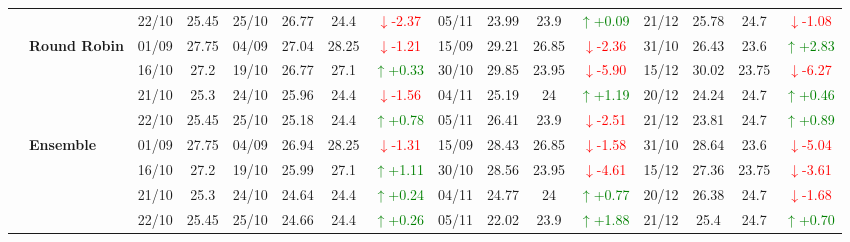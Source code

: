 \documentclass{ieeeaccess}
\begin{document}
{\begin{longtable}{llcc|cccc|cccc|cccc}
&
& 22/10 & 25.45 & 25/10 & 26.77 & 24.4 & \textcolor{red}{\(\downarrow\)-2.37} & 05/11 & 23.99 & 23.9 & \textcolor{green}{\(\uparrow\)+0.09} & 21/12 & 25.78 & 24.7 & \textcolor{red}{\(\downarrow\)-1.08} \\
\cmidrule(lr){2-16}


& \textbf{Round Robin}
& 01/09 & 27.75 & 04/09 & 27.04 & 28.25 & \textcolor{red}{\(\downarrow\)-1.21} & 15/09 & 29.21 & 26.85 & \textcolor{red}{\(\downarrow\)-2.36} & 31/10 & 26.43 & 23.6 & \textcolor{green}{\(\uparrow\)+2.83} \\

&
& 16/10 & 27.2 & 19/10 & 26.77 & 27.1 & \textcolor{green}{\(\uparrow\)+0.33} & 30/10 & 29.85 & 23.95 & \textcolor{red}{\(\downarrow\)-5.90} & 15/12 & 30.02 & 23.75 & \textcolor{red}{\(\downarrow\)-6.27} \\

&
& 21/10 & 25.3 & 24/10 & 25.96 & 24.4 & \textcolor{red}{\(\downarrow\)-1.56} & 04/11 & 25.19 & 24 & \textcolor{green}{\(\uparrow\)+1.19} & 20/12 & 24.24 & 24.7 & \textcolor{green}{\(\uparrow\)+0.46} \\

&
& 22/10 & 25.45 & 25/10 & 25.18 & 24.4 & \textcolor{green}{\(\uparrow\)+0.78} & 05/11 & 26.41 & 23.9 & \textcolor{red}{\(\downarrow\)-2.51} & 21/12 & 23.81 & 24.7 & \textcolor{green}{\(\uparrow\)+0.89} \\
\cmidrule(lr){2-16}



& \textbf{Ensemble}
& 01/09 & 27.75 & 04/09 & 26.94 & 28.25 & \textcolor{red}{\(\downarrow\)-1.31} & 15/09 & 28.43 & 26.85 & \textcolor{red}{\(\downarrow\)-1.58} & 31/10 & 28.64 & 23.6 & \textcolor{red}{\(\downarrow\)-5.04} \\

&
& 16/10 & 27.2 & 19/10 & 25.99 & 27.1 & \textcolor{green}{\(\uparrow\)+1.11} & 30/10 & 28.56 & 23.95 & \textcolor{red}{\(\downarrow\)-4.61} & 15/12 & 27.36 & 23.75 & \textcolor{red}{\(\downarrow\)-3.61} \\

&
& 21/10 & 25.3 & 24/10 & 24.64 & 24.4 & \textcolor{green}{\(\uparrow\)+0.24} & 04/11 & 24.77 & 24 & \textcolor{green}{\(\uparrow\)+0.77} & 20/12 & 26.38 & 24.7 & \textcolor{red}{\(\downarrow\)-1.68} \\

&
& 22/10 & 25.45 & 25/10 & 24.66 & 24.4 & \textcolor{green}{\(\uparrow\)+0.26} & 05/11 & 22.02 & 23.9 & \textcolor{green}{\(\uparrow\)+1.88} & 21/12 & 25.4 & 24.7 & \textcolor{green}{\(\uparrow\)+0.70} \\


\bottomrule
\end{longtable}
}
\end{document}
